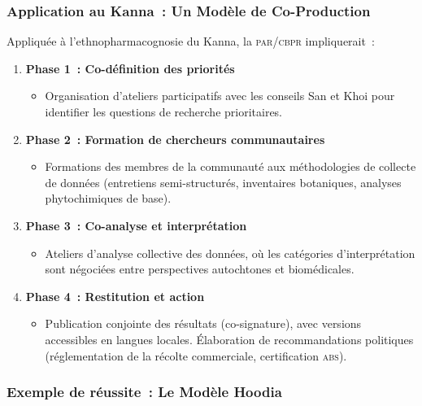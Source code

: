 \documentclass[12pt,a4paper,twoside]{book}
\begin{document}
\subsubsection{Application au Kanna~: Un Modèle de Co-Production}

Appliquée à l'ethnopharmacognosie du Kanna, la \textsc{par}/\textsc{cbpr} impliquerait~:

\begin{enumerate}
\item \textbf{Phase 1~: Co-définition des priorités}
   \begin{itemize}
   \item Organisation d'ateliers participatifs avec les conseils San et Khoi pour identifier les questions de recherche prioritaires.
   \end{itemize}

\item \textbf{Phase 2~: Formation de chercheurs communautaires}
   \begin{itemize}
   \item Formations des membres de la communauté aux méthodologies de collecte de données (entretiens semi-structurés, inventaires botaniques, analyses phytochimiques de base).
   \end{itemize}

\item \textbf{Phase 3~: Co-analyse et interprétation}
   \begin{itemize}
   \item Ateliers d'analyse collective des données, où les catégories d'interprétation sont négociées entre perspectives autochtones et biomédicales.
   \end{itemize}

\item \textbf{Phase 4~: Restitution et action}
   \begin{itemize}
   \item Publication conjointe des résultats (co-signature), avec versions accessibles en langues locales. Élaboration de recommandations politiques (réglementation de la récolte commerciale, certification \textsc{abs}).
   \end{itemize}
\end{enumerate}

\subsubsection{Exemple de réussite~: Le Modèle Hoodia}
\end{document}
